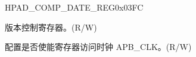 \begin{register}{H}{PAD\_COMP\_DATE\_REG}{0x03FC}\label{regdesc:PADCOMPDATEREG}
%
%
%
\regnewline%
\begin{regdesc}\begin{reglist}
\label{fielddesc:PADCOMPDATE}\item [PAD\_COMP\_DATE] 版本控制寄存器。(R/W)
\label{fielddesc:PADCOMPCLKEN}\item [PAD\_COMP\_CLK\_EN] 配置是否使能寄存器访问时钟 APB\_CLK。(R/W)
\end{reglist}\end{regdesc}
\end{register}
